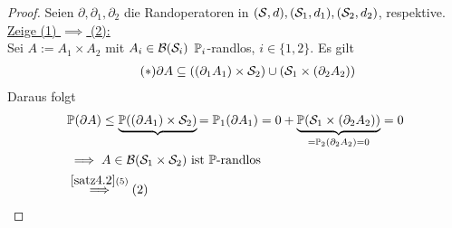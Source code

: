 \begin{proof}
	Seien $\partial,\partial_1,\partial_2$ die Randoperatoren in $(\S,d),(\S_1,d_1),(\S_2,d_2)$, respektive.\nl
	\underline{Zeige (1) $\implies$ (2):}\\
	Sei $A:=A_1\times A_2$ mit $A_i\in\B(\S_i)$ $\P_i$-randlos, $i\in\lbrace1,2\rbrace$. 
	Es gilt
	\begin{align}\label{eqProof4.19Stern}\tag{$\ast$}
		\partial A\subseteq((\partial_1 A_1)\times\S_2)\cup(\S_1\times(\partial_2 A_2))
	\end{align}
	Daraus folgt
	\begin{align*}
		&\P(\partial A)\leq \underbrace{\P((\partial A_1)\times\S_2)}{=\P_1(\partial A_1)=0}+\underbrace{\P(\S_1\times(\partial_2 A_2))}_ {=\P_2(\partial_2 A_2)=0}=0\\
		&\implies
		A\in\B(\S_1\times\S_2)\text{ ist $\P$-randlos}\\
		&\stackrel{\ref{satz4.2}(5)}{\implies}(2)
	\end{align*}


\end{proof}
